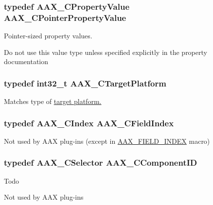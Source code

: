 \subsubsection[{A\+A\+X\+\_\+\+C\+Pointer\+Property\+Value}]{\setlength{\rightskip}{0pt plus 5cm}typedef {\bf A\+A\+X\+\_\+\+C\+Property\+Value} {\bf A\+A\+X\+\_\+\+C\+Pointer\+Property\+Value}}\label{a00149_a7abe263a7521e988ed4ee4ac691ed5f9}


Pointer-\/sized property values. 

Do not use this value type unless specified explicitly in the property documentation \hypertarget{a00149_a8f2cefa455217fa9f3ce190fe5fd8033}{}
\subsubsection[{A\+A\+X\+\_\+\+C\+Target\+Platform}]{\setlength{\rightskip}{0pt plus 5cm}typedef int32\+\_\+t {\bf A\+A\+X\+\_\+\+C\+Target\+Platform}}\label{a00149_a8f2cefa455217fa9f3ce190fe5fd8033}


Matches type of \hyperlink{a00206_a19e8cc27f59bb9bb4039b00fadb3cb83}{target platform.}

\hypertarget{a00149_ae807f8986143820cfb5d6da32165c9c7}{}
\subsubsection[{A\+A\+X\+\_\+\+C\+Field\+Index}]{\setlength{\rightskip}{0pt plus 5cm}typedef {\bf A\+A\+X\+\_\+\+C\+Index} {\bf A\+A\+X\+\_\+\+C\+Field\+Index}}\label{a00149_ae807f8986143820cfb5d6da32165c9c7}


Not used by A\+A\+X plug-\/ins (except in \hyperlink{a00149_acf807247ecd6e5899dc9dc31644e9a1d}{A\+A\+X\+\_\+\+F\+I\+E\+L\+D\+\_\+\+I\+N\+D\+E\+X} macro) 

\hypertarget{a00149_a7e697acf597bd7024de6bb13b9845ce7}{}
\subsubsection[{A\+A\+X\+\_\+\+C\+Component\+I\+D}]{\setlength{\rightskip}{0pt plus 5cm}typedef {\bf A\+A\+X\+\_\+\+C\+Selector} {\bf A\+A\+X\+\_\+\+C\+Component\+I\+D}}\label{a00149_a7e697acf597bd7024de6bb13b9845ce7}
\begin{DoxyRefDesc}{Todo}
\item[\hyperlink{a00382__todo000006}{Todo}]Not used by A\+A\+X plug-\/ins \end{DoxyRefDesc}
\hypertarget{a00149_a6d976263b5f3dd5d01a89d65a3b98ded}{}
